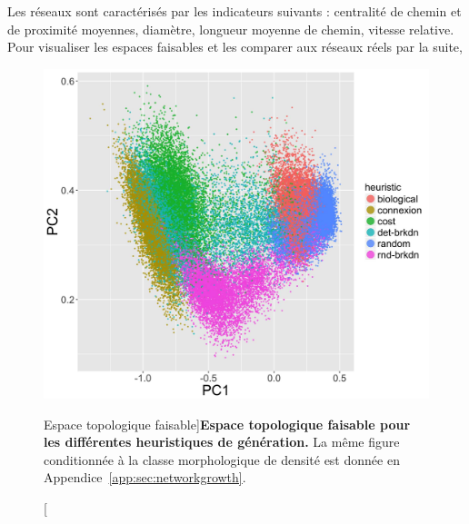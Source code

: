 Les réseaux sont caractérisés par les indicateurs suivants : centralité de chemin et de proximité moyennes, diamètre, longueur moyenne de chemin, vitesse relative. Pour visualiser les espaces faisables et les comparer aux réseaux réels par la suite, 

 





\begin{figure}
\includegraphics[width=\linewidth]{Figures/Final/7-1-2-fig-networkgrowth-feasiblespace.jpg}
\caption[Feasible topological space][Espace topologique faisable]{}{\textbf{Espace topologique faisable pour les différentes heuristiques de génération.} La même figure conditionnée à la classe morphologique de densité est donnée en Appendice~\ref{app:sec:networkgrowth}.\label{fig:networkgrowth:feasiblespace}}
\end{figure}

%



